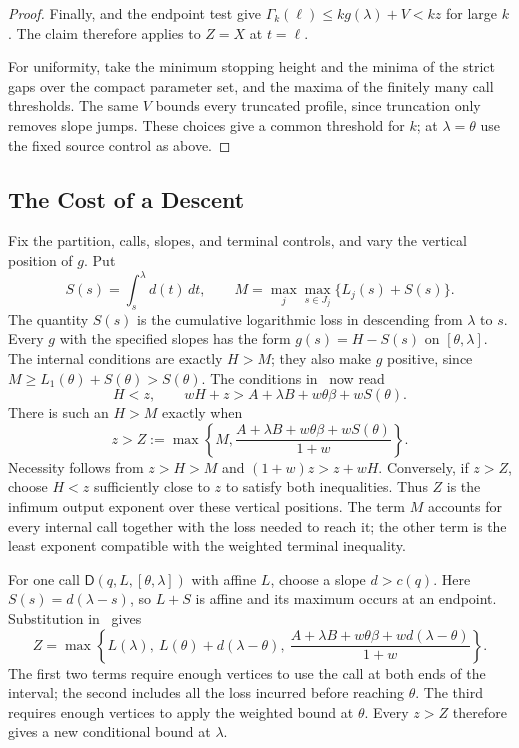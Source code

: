 \documentclass[11pt]{article}
\theoremstyle{definition}
\newcommand{\DD}{\mathsf D}
\begin{document}
\begin{proof}
Finally,  and the endpoint test give
$\Gamma_k(\ell)\le kg(\lambda)+V<kz$ for large $k$.
The claim therefore applies to $Z=X$ at $t=\ell$.

For uniformity, take the minimum stopping height and the minima of the strict gaps over the compact parameter set, and the maxima of the finitely many call thresholds.
The same $V$ bounds every truncated profile, since truncation only removes slope jumps.
These choices give a common threshold for $k$; at $\lambda=\theta$ use the fixed source control as above.
\end{proof}

\subsection{The Cost of a Descent}\label{sec:route-cost}
Fix the partition, calls, slopes, and terminal controls, and vary the vertical position of $g$.
Put
\begin{equation}\label{eq:route-costs}
 S(s)=\int_s^\lambda d(t)\,dt,\qquad
 M=\max_j\max_{s\in J_j}\{L_j(s)+S(s)\}.
\end{equation}
The quantity $S(s)$ is the cumulative logarithmic loss in descending from $\lambda$ to $s$.
Every $g$ with the specified slopes has the form $g(s)=H-S(s)$ on $[\theta,\lambda]$.
The internal conditions are exactly $H>M$; they also make $g$ positive, since $M\ge L_1(\theta)+S(\theta)>S(\theta)$.
The conditions in~ now read
\[
 H<z,\qquad wH+z>A+\lambda B+w\theta\beta+wS(\theta).
\]
There is such an $H>M$ exactly when
\begin{equation}\label{eq:route-optimum}
 z>Z:=\max\left\{M,
  \frac{A+\lambda B+w\theta\beta+wS(\theta)}{1+w}\right\}.
\end{equation}
Necessity follows from $z>H>M$ and $(1+w)z>z+wH$.
Conversely, if $z>Z$, choose $H<z$ sufficiently close to $z$ to satisfy both inequalities.
Thus $Z$ is the infimum output exponent over these vertical positions.
The term $M$ accounts for every internal call together with the loss needed to reach it; the other term is the least exponent compatible with the weighted terminal inequality.

For one call $\DD(q,L,[\theta,\lambda])$ with affine $L$, choose a slope $d>c(q)$.
Here $S(s)=d(\lambda-s)$, so $L+S$ is affine and its maximum occurs at an endpoint.
Substitution in~ gives
\[
 Z=\max\left\{L(\lambda),\ L(\theta)+d(\lambda-\theta),\
 \frac{A+\lambda B+w\theta\beta+wd(\lambda-\theta)}{1+w}\right\}.
\]
The first two terms require enough vertices to use the call at both ends of the interval; the second includes all the loss incurred before reaching $\theta$.
The third requires enough vertices to apply the weighted bound at $\theta$.
Every $z>Z$ therefore gives a new conditional bound at $\lambda$.
\end{document}
